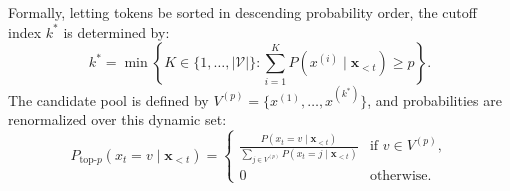 \documentclass[../../../main.tex]{subfiles}
\begin{document}
Formally, letting tokens be sorted in descending probability order, the cutoff index $k^*$ is determined by:
\begin{equation}
k^* = \min \left\{ K \in \{1, \dots, |\mathcal{V}|\} : \sum_{i=1}^K P(x^{(i)} \mid \mathbf{x}_{<t}) \ge p \right\}.
\label{eq:nucleus_cutoff_index}
\end{equation}
The candidate pool is defined by $V^{(p)} = \{x^{(1)}, \dots, x^{(k^*)}\}$, and probabilities are renormalized over this dynamic set:
\begin{equation}
P_{\text{top-}p}(x_t = v \mid \mathbf{x}_{<t}) = \begin{cases}
\frac{P(x_t = v \mid \mathbf{x}_{<t})}{\sum_{j \in V^{(p)}} P(x_t = j \mid \mathbf{x}_{<t})} & \text{if } v \in V^{(p)}, \\
0 & \text{otherwise}.
\end{cases}
\label{eq:nucleus_renormalization}
\end{equation}
\end{document}
